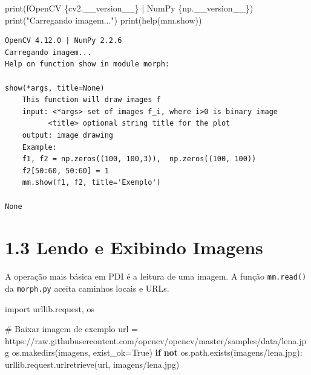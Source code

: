 \documentclass[
  portuguese,
  letterpaper,
  openany,
  oneside,
  12pt,
  a4paper]{book}
\newenvironment{Shaded}{\begin{snugshade}}{\end{snugshade}}
\newcommand{\BuiltInTok}[1]{\textcolor[rgb]{0.00,0.23,0.31}{#1}}
\newcommand{\CommentTok}[1]{\textcolor[rgb]{0.37,0.37,0.37}{#1}}
\newcommand{\ControlFlowTok}[1]{\textcolor[rgb]{0.00,0.23,0.31}{\textbf{#1}}}
\newcommand{\ImportTok}[1]{\textcolor[rgb]{0.00,0.46,0.62}{#1}}
\newcommand{\KeywordTok}[1]{\textcolor[rgb]{0.00,0.23,0.31}{\textbf{#1}}}
\newcommand{\NormalTok}[1]{\textcolor[rgb]{0.00,0.23,0.31}{#1}}
\newcommand{\OperatorTok}[1]{\textcolor[rgb]{0.37,0.37,0.37}{#1}}
\newcommand{\SpecialCharTok}[1]{\textcolor[rgb]{0.37,0.37,0.37}{#1}}
\newcommand{\SpecialStringTok}[1]{\textcolor[rgb]{0.13,0.47,0.30}{#1}}
\newcommand{\StringTok}[1]{\textcolor[rgb]{0.13,0.47,0.30}{#1}}
\newcommand{\VariableTok}[1]{\textcolor[rgb]{0.07,0.07,0.07}{#1}}
\begin{document}
\begin{tcolorbox}
\begin{Shaded}
\begin{Highlighting}[]
\BuiltInTok{print}\NormalTok{(}\SpecialStringTok{f\textquotesingle{}OpenCV }\SpecialCharTok{\{}\NormalTok{cv2}\SpecialCharTok{.}\NormalTok{\_\_version\_\_}\SpecialCharTok{\}}\SpecialStringTok{ | NumPy }\SpecialCharTok{\{}\NormalTok{np}\SpecialCharTok{.}\NormalTok{\_\_version\_\_}\SpecialCharTok{\}}\SpecialStringTok{\textquotesingle{}}\NormalTok{)}
\BuiltInTok{print}\NormalTok{(}\StringTok{"Carregando imagem..."}\NormalTok{)}
\BuiltInTok{print}\NormalTok{(}\BuiltInTok{help}\NormalTok{(mm.show))}
\end{Highlighting}
\end{Shaded}

\begin{verbatim}
OpenCV 4.12.0 | NumPy 2.2.6
Carregando imagem...
Help on function show in module morph:

show(*args, title=None)
    This function will draw images f
    input: <*args> set of images f_i, where i>0 is binary image
          <title> optional string title for the plot
    output: image drawing
    Example:
    f1, f2 = np.zeros((100, 100,3)),  np.zeros((100, 100))
    f2[50:60, 50:60] = 1
    mm.show(f1, f2, title='Exemplo')

None
\end{verbatim}

\section{1.3 Lendo e Exibindo Imagens}\label{lendo-e-exibindo-imagens-2}

A operação mais básica em PDI é a leitura de uma imagem. A função
\texttt{mm.read()} da \texttt{morph.py} aceita caminhos locais e URLs.

\begin{Shaded}
\begin{Highlighting}[]
\ImportTok{import}\NormalTok{ urllib.request, os}

\CommentTok{\# Baixar imagem de exemplo}
\NormalTok{url }\OperatorTok{=} \StringTok{\textquotesingle{}https://raw.githubusercontent.com/opencv/opencv/master/samples/data/lena.jpg\textquotesingle{}}
\NormalTok{os.makedirs(}\StringTok{\textquotesingle{}imagens\textquotesingle{}}\NormalTok{, exist\_ok}\OperatorTok{=}\VariableTok{True}\NormalTok{)}
\ControlFlowTok{if} \KeywordTok{not}\NormalTok{ os.path.exists(}\StringTok{\textquotesingle{}imagens/lena.jpg\textquotesingle{}}\NormalTok{):}
\NormalTok{    urllib.request.urlretrieve(url, }\StringTok{\textquotesingle{}imagens/lena.jpg\textquotesingle{}}\NormalTok{)}


\end{Highlighting}
\end{Shaded}
\end{tcolorbox}
\end{document}
